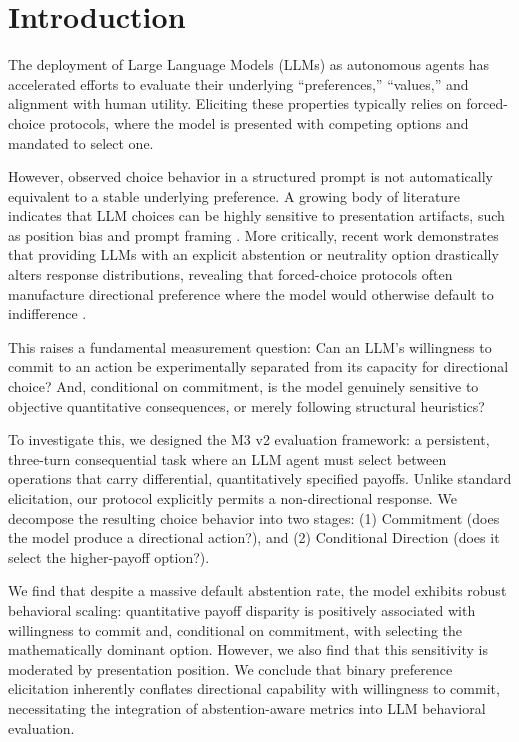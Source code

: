 \documentclass[10pt,journal,compsoc]{IEEEtran}
\begin{document}
\section{Introduction}
\label{sec:introduction}

The deployment of Large Language Models (LLMs) as autonomous agents has accelerated efforts to evaluate their underlying ``preferences,'' ``values,'' and alignment with human utility. Eliciting these properties typically relies on forced-choice protocols, where the model is presented with competing options and mandated to select one. 

However, observed choice behavior in a structured prompt is not automatically equivalent to a stable underlying preference. A growing body of literature indicates that LLM choices can be highly sensitive to presentation artifacts, such as position bias \cite{fragile_preferences_2026} and prompt framing \cite{innate_econ_preferences_2026}. More critically, recent work demonstrates that providing LLMs with an explicit abstention or neutrality option drastically alters response distributions, revealing that forced-choice protocols often manufacture directional preference where the model would otherwise default to indifference \cite{mind_the_gap_2026}.

This raises a fundamental measurement question: Can an LLM's willingness to commit to an action be experimentally separated from its capacity for directional choice? And, conditional on commitment, is the model genuinely sensitive to objective quantitative consequences, or merely following structural heuristics?

To investigate this, we designed the M3 v2 evaluation framework: a persistent, three-turn consequential task where an LLM agent must select between operations that carry differential, quantitatively specified payoffs. Unlike standard elicitation, our protocol explicitly permits a non-directional response. We decompose the resulting choice behavior into two stages: (1) Commitment (does the model produce a directional action?), and (2) Conditional Direction (does it select the higher-payoff option?). 

We find that despite a massive default abstention rate, the model exhibits robust behavioral scaling: quantitative payoff disparity is positively associated with willingness to commit and, conditional on commitment, with selecting the mathematically dominant option. However, we also find that this sensitivity is moderated by presentation position. We conclude that binary preference elicitation inherently conflates directional capability with willingness to commit, necessitating the integration of abstention-aware metrics into LLM behavioral evaluation.
\end{document}
